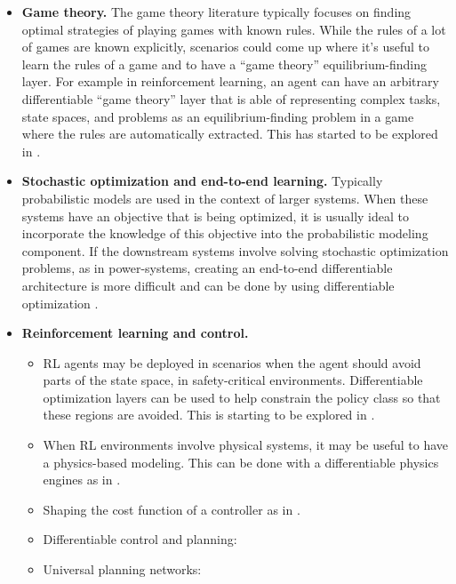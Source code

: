 \begin{itemize}
\item \textbf{Game theory.}
  The game theory literature typically focuses on finding
  optimal strategies of playing games with known rules.
  While the rules of a lot of games are known explicitly,
  scenarios could come up where it's useful to learn the
  rules of a game and to have a ``game theory''
  equilibrium-finding layer.
  For example in reinforcement learning, an agent can have an
  arbitrary differentiable ``game theory'' layer that is able
  of representing complex tasks, state spaces, and
  problems as an equilibrium-finding problem in a game
  where the rules are automatically extracted.
  This has started to be explored in
  \citet{ling2018game}.
\item \textbf{Stochastic optimization and end-to-end learning.}
  Typically probabilistic models are used in the context of
  larger systems. When these systems have an objective
  that is being optimized, it is usually ideal to incorporate
  the knowledge of this objective into the probabilistic modeling
  component.
  If the downstream systems involve solving
  stochastic optimization problems, as in power-systems,
  creating an end-to-end differentiable architecture is
  more difficult and can be done by using
  differentiable optimization \citep{donti2017task}.
\item \textbf{Reinforcement learning and control.}
  \begin{itemize}
  \item RL agents may be deployed in scenarios when
    the agent should avoid parts of the state space,
    \eg in safety-critical environments.
    Differentiable optimization layers can be used
    to help constrain the policy class so that these
    regions are avoided.
    This is starting to be explored in
    \citet{dalal2018safe,pham2018optlayer}.
  \item When RL environments involve physical systems,
    it may be useful to have a physics-based modeling.
    This can be done with a differentiable
    physics engines as in \citet{de2018end}.
  \item Shaping the cost function of a
    controller as in \citet{tamar2017learning}.
  \item Differentiable control and planning:
    \citet{chen2018optimal,chen2018approximating,karkus2018integrating}
  \item Universal planning networks: \citep{srinivas2018universal}
  \end{itemize}

\end{itemize}
